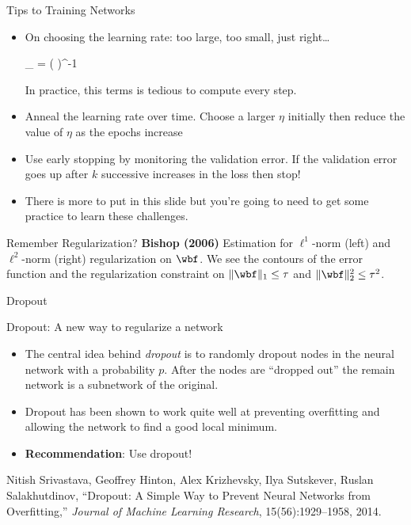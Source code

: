 \documentclass[aspectratio=169,xcolor=dvipsnames,svgnames,x11names,fleqn]{beamer}
\begin{document}
\begin{frame}{Tips to Training Networks}
	\begin{block}{}
		\begin{itemize}
			\item On choosing the learning rate: too large, too small, just right\ldots
			\begin{multiequation}
				\eta_{} = \left( \right)^{-1} %
			\end{multiequation}
			In practice, this terms is tedious to compute every step. 
			\item Anneal the learning rate over time. Choose a larger $\eta$ initially then reduce the value of $\eta$ as the epochs increase
			\item Use early stopping by monitoring the validation error. If the validation error goes up after $k$ successive increases in the loss then stop! 
			\item There is more to put in this slide but you're going to need to get some practice to learn these challenges. 
		\end{itemize}
	\end{block}

\end{frame}



\begin{frame}{Remember Regularization?}
  {\small\bf\color{MediumBlue}Bishop (2006)}
  Estimation for $\ell^1$-norm (left) and $\ell^2$-norm (right) regularization on 
  $\wbf$. We see the contours of the error function and the regularization constraint 
  on $\|\wbf\|_1 \leq \tau$ and $\|\wbf\|_2^2 \leq \tau^2$.

\end{frame}

\begin{frame}{Dropout}

\begin{tblock}{Dropout: A new way to regularize a network}
\begin{itemize}
    \item The central idea behind {\em\color{MediumBlue}dropout} is to randomly dropout nodes in the neural network with a probability $p$. After the nodes are ``dropped out'' the remain network is a subnetwork of the original. 
    \item Dropout has been shown to work quite well at preventing overfitting and allowing the network to find a good local minimum. 
    \item {\bf\color{MediumRed}Recommendation}: Use dropout! 
\end{itemize}
\end{tblock}
{\footnotesize
Nitish Srivastava, Geoffrey Hinton, Alex Krizhevsky, Ilya Sutskever, Ruslan Salakhutdinov, ``Dropout: A Simple Way to Prevent Neural Networks from Overfitting,'' {\em Journal of Machine Learning Research}, 15(56):1929--1958, 2014.}
\end{frame}
\end{document}
